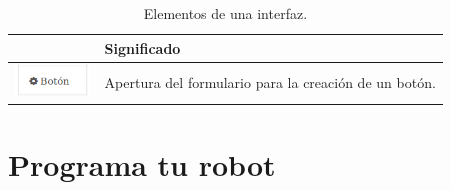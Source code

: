 \begin{table}[H]
  \begin{center}
    \begin{tabular}{|p{2cm}|p{10cm}|}
      \hline
      \centering{Botón} & \qquad \quad Significado \\
      \hline
      \includegraphics[width=2cm]{imagenes/manual-usuario/nuevo-boton.png} & Apertura del formulario para la creación de un botón. \\
      \hline
    \end{tabular}
  \end{center}
\caption{Elementos de una interfaz.}
\end{table}


\section{ Programa tu robot }
\label{sec:programacion-robot}


